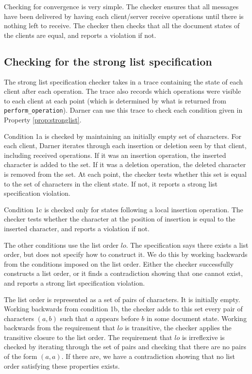 \documentclass[sigplan,10pt,review,anonymous]{acmart}
\begin{document}
Checking for convergence is very simple. The checker ensures that all messages have been delivered by having each client/server receive operations
until there is nothing left to receive. The checker then checks that all the document states of the clients are equal, and reports a violation if not.

\subsection{Checking for the strong list specification}

The strong list specification checker takes in a trace containing the state of each client after each operation. The trace also records which operations were visible
to each client at each point (which is determined by what is returned from \texttt{perform\_operation}). Darner can use this trace to check each condition given in Property \ref{prop:stronglist}.

Condition 1a is checked by maintaining an initially empty set of characters. For each client, Darner
iterates through each insertion or deletion seen by that client, including received operations. If it was an insertion operation, the inserted character is added to the set.
If it was a deletion operation, the deleted character is removed from the set. At each point, the checker tests whether this set is equal to the set of characters in the client state. If not, it reports a strong list specification violation.

Condition 1c is checked only for states following a local insertion operation. The checker tests whether the character at the position of insertion is equal
to the inserted character, and reports a violation if not.

The other conditions use the list order $\mathit{lo}$. The specification says there exists a list order, but does not specify how to construct it.
We do this by working backwards from the conditions imposed on the list order. Either the checker successfully constructs a list order, or it finds a contradiction showing that one cannot exist, and reports a strong list specification violation.

The list order is represented as a set of pairs of characters. It is initially empty. Working backwards from condition 1b, the checker adds to this set every pair of characters $(a,b)$ such that $a$ appears before $b$ in some document state. Working backwards from the requirement that $\mathit{lo}$ is transitive, the checker applies the transitive closure to the list order. The requirement that $\mathit{lo}$ is irreflexive is checked by iterating through the set of pairs and checking that there are no pairs of the form $(a,a)$. If there are, we have a contradiction showing that no list order satisfying these properties exists.
\end{document}
